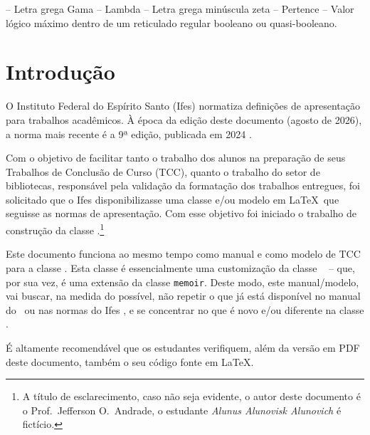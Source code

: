\documentclass[times,english,brazilian,oneside,section=TITLE]{ifes8}
\begin{document}
\begin{simbolos}
  \simb{$\Gamma$} -- Letra grega Gama
  \simb{$\Lambda$} -- Lambda
  \simb{$\zeta$} -- Letra grega minúscula zeta
  \simb{$\in$} -- Pertence
  \simb{$\top$} -- Valor lógico máximo dentro de um reticulado regular booleano ou quasi-booleano.
\end{simbolos}
\cleardoublepage


\imprimirsumario
\cleardoublepage


\textual


\setlength{\afterchapskip}{0\baselineskip}


\chapter{Introdução}
\label{cha:introducao}

O Instituto Federal do Espírito Santo (Ifes) normatiza definições de
apresentação para trabalhos acadêmicos. À época da edição deste
documento (agosto de 2026), a norma mais recente é a 9ª edição,
publicada em 2024 \cite{Ifes2024}.

Com o objetivo de facilitar tanto o trabalho dos alunos na preparação
de seus Trabalhos de Conclusão de Curso (TCC), quanto o trabalho do
setor de bibliotecas, responsável pela validação da formatação dos
trabalhos entregues, foi solicitado que o Ifes disponibilizasse uma
classe e/ou modelo em \LaTeX\ que seguisse as normas de
apresentação. Com esse objetivo foi iniciado o trabalho de construção
da classe \ifestex.\footnote{A título de esclarecimento, caso não seja
  evidente, o autor deste documento é o Prof.\ Jefferson O.\ Andrade,
  o estudante \emph{Alunus Alunovisk Alunovich} é fictício.}

Este documento funciona ao mesmo tempo como manual e como modelo de
TCC para a classe \ifestex. Esta classe é essencialmente uma
customização da classe \abnTeX\ \cite{abntex2classe} -- que, por sua
vez, é uma extensão da classe \texttt{memoir}. Deste modo, este
manual/modelo, vai buscar, na medida do possível, não repetir o que já
está disponível no manual do \abnTeX\ ou nas normas do Ifes
\cite{Ifes2024}, e se concentrar no que é novo e/ou diferente na
classe \ifestex.

É altamente recomendável que os estudantes verifiquem, além da versão
em PDF deste documento, também o seu código fonte em \LaTeX.
\end{document}
